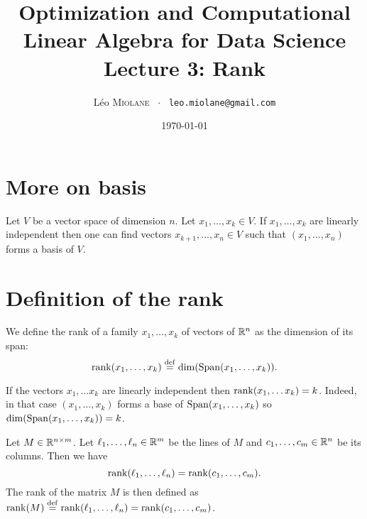 \documentclass[11pt,nocut]{article}
\title{\vspace{-2.0cm}%
	Optimization and Computational Linear Algebra for Data Science\\
	Lecture 3: Rank}
\author{Léo \textsc{Miolane} \ $\cdot$ \ \texttt{leo.miolane@gmail.com}}
\date{\today}
\begin{document}
\maketitle


\section{More on basis}

\begin{proposition}\label{prop:complete}
	Let $V$ be a vector space of dimension $n$.
	Let $x_1, \dots, x_k \in V$. 
	If $x_1, \dots, x_k$  are linearly independent then one can find vectors $x_{k+1}, \dots, x_{n} \in V$ such that $(x_1, \dots, x_n)$ forms a basis of $V$.
\end{proposition}


\section{Definition of the rank}

\begin{definition}
	We define the rank of a family $x_1, \dots, x_k$ of vectors of $\mathbb{R}^n$ as the dimension of its span:
	$$
	{{\rm rank}}(x_1, \dots, x_k) \overset{\rm def}{=} {{\rm dim}} ({{\rm Span}}(x_1, \dots, x_k)).
	$$
\end{definition}

If the vectors $x_1, \dots x_k$ are linearly independent then ${{\rm rank}}(x_1, \dots x_k) = k$. Indeed, in that case $(x_1, \dots, x_k)$ forms a base of ${{\rm Span}}(x_1, \dots, x_k)$ so ${{\rm dim}}({{\rm Span}}(x_1, \dots, x_k)) = k$.


\begin{definition}\label{def:rank}
	Let $M \in \mathbb{R}^{n \times m}$. Let $\ell_1, \dots, \ell_n \in \mathbb{R}^m$ be the lines of $M$ and $c_1, \dots, c_m \in \mathbb{R}^n$ be its columns.
	Then we have
	\begin{equation}\label{eq:rank}
	{{\rm rank}}(\ell_1, \dots, \ell_n) = {{\rm rank}}(c_1, \dots, c_m).
	\end{equation}
	The rank of the matrix $M$ is then defined as ${{\rm rank}}(M) \overset{\rm def}{=}{{\rm rank}}(\ell_1, \dots, \ell_n) = {{\rm rank}}(c_1, \dots, c_m)$.
\end{definition}
\end{document}
